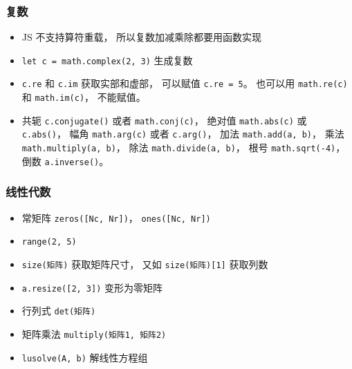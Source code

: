 \subsubsection{复数}
\begin{itemize}
\item JS 不支持算符重载， 所以复数加减乘除都要用函数实现
\item \verb|let c = math.complex(2, 3)| 生成复数
\item \verb|c.re| 和 \verb|c.im| 获取实部和虚部， 可以赋值 \verb|c.re = 5|。 也可以用 \verb|math.re(c)| 和 \verb|math.im(c)|， 不能赋值。
\item 共轭 \verb|c.conjugate()| 或者 \verb|math.conj(c)|， 绝对值 \verb|math.abs(c)| 或 \verb|c.abs()|， 幅角 \verb|math.arg(c)| 或者 \verb|c.arg()|， 加法 \verb|math.add(a, b)|， 乘法 \verb|math.multiply(a, b)|， 除法 \verb|math.divide(a, b)|， 根号 \verb|math.sqrt(-4)|， 倒数 \verb|a.inverse()|。
\end{itemize}

\subsubsection{线性代数}
\begin{itemize}
\item 常矩阵 \verb|zeros([Nc, Nr])|， \verb|ones([Nc, Nr])|
\item \verb|range(2, 5)|
\item \verb|size(矩阵)| 获取矩阵尺寸， 又如 \verb|size(矩阵)[1]| 获取列数
\item \verb|a.resize([2, 3])| 变形为零矩阵
\item 行列式 \verb|det(矩阵)|
\item 矩阵乘法 \verb|multiply(矩阵1, 矩阵2)|
\item \verb|lusolve(A, b)| 解线性方程组
\end{itemize}
